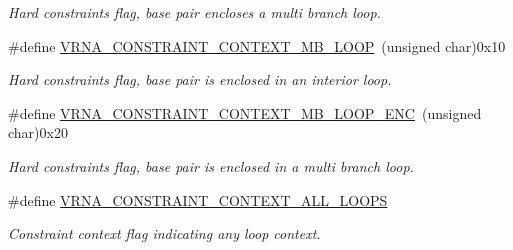 \begin{DoxyCompactItemize}
\begin{DoxyCompactList}\small\item\em Hard constraints flag, base pair encloses a multi branch loop. \end{DoxyCompactList}\item 
\mbox{\label{group__hard__constraints_ga456ecd2ff00056bb64da8dd4f61bbfc5}} 
\#define \mbox{\hyperlink{group__hard__constraints_ga456ecd2ff00056bb64da8dd4f61bbfc5}{V\+R\+N\+A\+\_\+\+C\+O\+N\+S\+T\+R\+A\+I\+N\+T\+\_\+\+C\+O\+N\+T\+E\+X\+T\+\_\+\+M\+B\+\_\+\+L\+O\+OP}}~(unsigned char)0x10
\begin{DoxyCompactList}\small\item\em Hard constraints flag, base pair is enclosed in an interior loop. \end{DoxyCompactList}\item 
\mbox{\label{group__hard__constraints_ga02a3d703ddbcfce393e4bbfcb9db7077}} 
\#define \mbox{\hyperlink{group__hard__constraints_ga02a3d703ddbcfce393e4bbfcb9db7077}{V\+R\+N\+A\+\_\+\+C\+O\+N\+S\+T\+R\+A\+I\+N\+T\+\_\+\+C\+O\+N\+T\+E\+X\+T\+\_\+\+M\+B\+\_\+\+L\+O\+O\+P\+\_\+\+E\+NC}}~(unsigned char)0x20
\begin{DoxyCompactList}\small\item\em Hard constraints flag, base pair is enclosed in a multi branch loop. \end{DoxyCompactList}\item 
\mbox{\label{group__hard__constraints_ga886d9127c49bb982a4b67cd7581e8a5a}} 
\#define \mbox{\hyperlink{group__hard__constraints_ga886d9127c49bb982a4b67cd7581e8a5a}{V\+R\+N\+A\+\_\+\+C\+O\+N\+S\+T\+R\+A\+I\+N\+T\+\_\+\+C\+O\+N\+T\+E\+X\+T\+\_\+\+A\+L\+L\+\_\+\+L\+O\+O\+PS}}
\begin{DoxyCompactList}\small\item\em Constraint context flag indicating any loop context. \end{DoxyCompactList}\end{DoxyCompactItemize}
